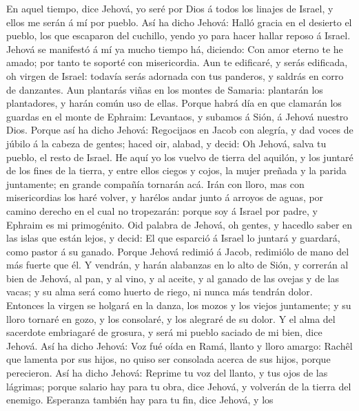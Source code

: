  En aquel tiempo, dice Jehová, yo seré por Dios á todos los
linajes de Israel, y ellos me serán á mí por pueblo.  Así ha
dicho Jehová: Halló gracia en el desierto el pueblo, los que escaparon
del cuchillo, yendo yo para hacer hallar reposo á Israel. 
Jehová se manifestó á mí ya mucho tiempo há, diciendo: Con amor eterno
te he amado; por tanto te soporté con misericordia.  Aun te
edificaré, y serás edificada, oh virgen de Israel: todavía serás
adornada con tus panderos, y saldrás en corro de danzantes. 
Aun plantarás viñas en los montes de Samaria: plantarán los plantadores,
y harán común uso de ellas.  Porque habrá día en que
clamarán los guardas en el monte de Ephraim: Levantaos, y subamos á
Sión, á Jehová nuestro Dios.  Porque así ha dicho Jehová:
Regocijaos en Jacob con alegría, y dad voces de júbilo á la cabeza de
gentes; haced oir, alabad, y decid: Oh Jehová, salva tu pueblo, el resto
de Israel.  He aquí yo los vuelvo de tierra del aquilón, y
los juntaré de los fines de la tierra, y entre ellos ciegos y cojos, la
mujer preñada y la parida juntamente; en grande compañía tornarán acá.
 Irán con lloro, mas con misericordias los haré volver, y
harélos andar junto á arroyos de aguas, por camino derecho en el cual no
tropezarán: porque soy á Israel por padre, y Ephraim es mi primogénito.
 Oid palabra de Jehová, oh gentes, y hacedlo saber en las
islas que están lejos, y decid: El que esparció á Israel lo juntará y
guardará, como pastor á su ganado.  Porque Jehová redimió á
Jacob, redimiólo de mano del más fuerte que él.  Y vendrán,
y harán alabanzas en lo alto de Sión, y correrán al bien de Jehová, al
pan, y al vino, y al aceite, y al ganado de las ovejas y de las vacas; y
su alma será como huerto de riego, ni nunca más tendrán dolor.
 Entonces la virgen se holgará en la danza, los mozos y los
viejos juntamente; y su lloro tornaré en gozo, y los consolaré, y los
alegraré de su dolor.  Y el alma del sacerdote embriagaré
de grosura, y será mi pueblo saciado de mi bien, dice Jehová.
 Así ha dicho Jehová: Voz fué oída en Ramá, llanto y lloro
amargo: Rachêl que lamenta por sus hijos, no quiso ser consolada acerca
de sus hijos, porque perecieron.  Así ha dicho Jehová:
Reprime tu voz del llanto, y tus ojos de las lágrimas; porque salario
hay para tu obra, dice Jehová, y volverán de la tierra del enemigo.
 Esperanza también hay para tu fin, dice Jehová, y los

